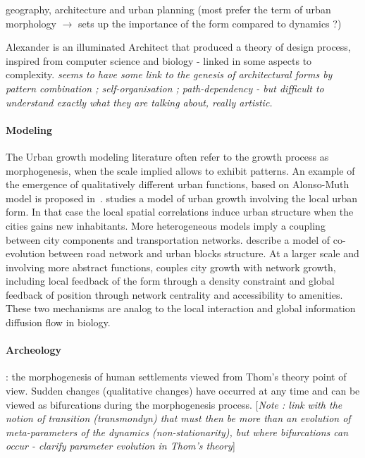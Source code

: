 \documentclass[fleqn,10pt]{wlscirep}
\begin{document}
\cite{moudon1997urban} geography, architecture and urban planning (most prefer the term of urban morphology $\rightarrow$ sets up the importance of the form compared to dynamics ?)

\cite{mehaffy2007notes} Alexander is an illuminated Architect that produced a theory of design process, inspired from computer science and biology - linked in some aspects to complexity. \textit{seems to have some link to the genesis of architectural forms by pattern combination ; self-organisation ; path-dependency - but difficult to understand exactly what they are talking about, really artistic.}


\paragraph{Modeling}

The Urban growth modeling literature often refer to the growth process as morphogenesis, when the scale implied allows to exhibit patterns. An example of the emergence of qualitatively different urban functions, based on Alonso-Muth model is proposed in~\cite{bonin2012modele}. \cite{makse1998modeling} studies a model of urban growth involving the local urban form. In that case the local spatial correlations induce urban structure when the cities gains new inhabitants. More heterogeneous models imply a coupling between city components and transportation networks. \cite{achibet2014model} describe a model of co-evolution between road network and urban blocks structure. At a larger scale and involving more abstract functions, \cite{raimbault2014hybrid} couples city growth with network growth, including local feedback of the form through a density constraint and global feedback of position through network centrality and accessibility to amenities. These two mechanisms are analog to the local interaction and global information diffusion flow in biology.

\paragraph{Archeology}

\cite{renfrew1978trajectory} : the morphogenesis of human settlements viewed from Thom's theory point of view. Sudden changes (qualitative changes) have occurred at any time and can be viewed as bifurcations during the morphogenesis process. [\textit{Note : link with the notion of transition (transmondyn) that must then be more than an evolution of meta-parameters of the dynamics (non-stationarity), but where bifurcations can occur - clarify parameter evolution in Thom's theory}]
\end{document}
